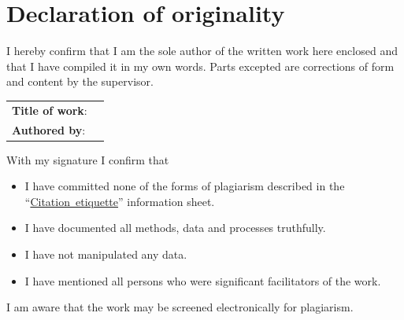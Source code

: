 \documentclass[
    a4paper, %
    fontsize=11pt, %
    twoside=true, %
	numbers=noenddot, %
	fontmethod=modern, %
]{kaobook}
\begin{document}


\printglossary[title=Special Terms, toctitle=List of Terms] %



\printindex %


\cleardoubleoddpage

\chapter{Declaration of originality}

I hereby confirm that I am the sole author of the written work here enclosed and that I have compiled it in my own words. Parts excepted are corrections of form and content by the supervisor.

\vfill

\makeatletter
\begin{center}
	\begin{tabular}[t]{@{}ll@{}}%
		\textbf{Title of work}: & \@title  \\
		\textbf{Authored by}:   & \@author \\
	\end{tabular}
\end{center}
\makeatother

\vfill

With my signature I confirm that
\begin{itemize}
	\item I have committed none of the forms of plagiarism described in the \enquote{\href{https://www.ethz.ch/content/dam/ethz/main/education/rechtliches-abschluesse/leistungskontrollen/plagiarism-citationetiquette.pdf}{Citation~etiquette}} information sheet.
	\item I have documented all methods, data and processes truthfully.
	\item I have not manipulated any data.
	\item I have mentioned all persons who were significant facilitators of the work.
\end{itemize}

I am aware that the work may be screened electronically for plagiarism.

\signaturefield{}

\end{document}
